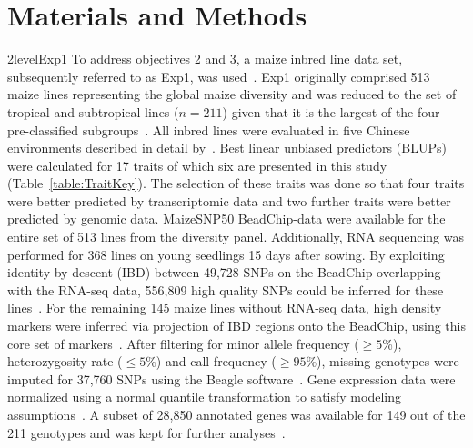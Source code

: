\documentclass[12pt,titlepage]{article}
\begin{document}
\section{Materials and Methods}
\Genetics2level{Exp1}
To address objectives 2 and 3, a maize inbred line data set, subsequently
referred to as Exp1, was used~\cite{Yang2014}.
Exp1 originally comprised 513 maize lines representing the global maize
diversity  and was reduced to the set of tropical and subtropical lines
($n = 211$) given that it is the largest of the four pre-classified
subgroups~\cite{Yang2014}.
All inbred lines were evaluated in five Chinese environments described in detail
by~.
Best linear unbiased predictors (BLUPs) were calculated for 17 traits of which 
six are presented in this study (Table~\ref{table:TraitKey}).
The selection of these traits was done so that four traits were better 
predicted by transcriptomic data and two further traits were better predicted 
by genomic data.
MaizeSNP50 BeadChip-data were available for the entire set of 513 lines from the
diversity panel.
Additionally, RNA sequencing was performed for 368 lines on young seedlings 15 
days after sowing.
By exploiting identity by descent (IBD) between 49,728 SNPs on the BeadChip 
overlapping with the RNA-seq data, 556,809 high quality SNPs could be inferred 
for these lines~\cite{Fu2013,Li2013}.
For the remaining 145 maize lines without RNA-seq data, high density markers
were inferred via projection of IBD regions onto the BeadChip, using this core 
set of markers~\cite{Yang2014}.
After filtering for minor allele frequency ($\geq 5$\%), heterozygosity rate
($\leq 5$\%) and call frequency ($\geq 95$\%), missing genotypes were imputed 
for 37,760 SNPs using the Beagle software~\cite{Browning2009}.
Gene expression data were normalized using a normal quantile transformation to
satisfy modeling assumptions~\cite{Fu2013}.
A subset of 28,850 annotated genes was available for 149 out of the 211
genotypes and was kept for further analyses~\cite{Li2013}.
\end{document}
